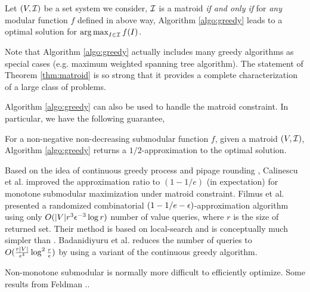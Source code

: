 \begin{theorem}
  \label{thm:matroid}
  Let $(V, \mathcal{I})$ be a set system we consider, $\mathcal{I}$ is a matroid \emph{if and only if} for \emph{any} modular function $f$ defined in above way, Algorithm \ref{algo:greedy} leads to a optimal solution for $\operatorname*{arg\,max}_{I\in \mathcal{I}} f(I)$.
\end{theorem}
Note that Algorithm \ref{algo:greedy} actually includes many greedy algorithms as special cases (e.g. maximum weighted spanning tree algorithm). The statement of Theorem \ref{thm:matroid} is so strong that it provides a complete  characterization of a large class of problems.

Algorithm \ref{algo:greedy} can also be used to handle the matroid constraint. In particular, we have the following guarantee,
\begin{theorem}
  \label{thm:sub-matroid}
  For a non-negative non-decreasing submodular function $f$, given a matroid $(V, \mathcal{I})$, Algorithm \ref{algo:greedy} returns a $1/2$-approximation to the optimal solution.
\end{theorem}

Based on the idea of continuous greedy process \cite{V08} and pipage rounding \cite{AS04}, Calinescu et al. \cite{CCP+11} improved the approximation ratio to $(1 - 1/e)$ (in expectation) for monotone submodular maximization under matroid constraint. Filmus et al. \cite{FW14} presented a randomized combinatorial $(1 - 1/e -\epsilon)$-approximation algorithm using only $O(|V|r^3\epsilon^{-3}\log r)$ number of value queries, where $r$ is the size of returned set. Their method is based on local-search and is conceptually much simpler than \cite{CCP+11}. Badanidiyuru et al. \cite{BV14} reduces the number of queries to $O(\frac{r|V|}{\epsilon^4}\log^2\frac{r}{\epsilon})$ by using a variant of the continuous greedy algorithm.







Non-monotone submodular is normally more difficult to efficiently optimize. Some results from Feldman ..












